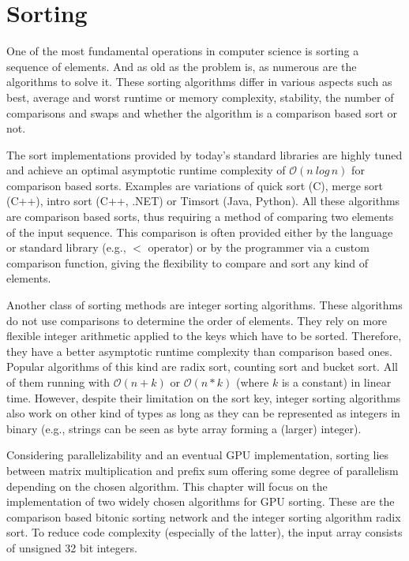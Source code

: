 \chapter{Sorting}
\label{sec:sorting}

One of the most fundamental operations in computer science is sorting a sequence of elements. And as old as the problem is, as numerous are the algorithms to solve it. These sorting algorithms differ in various aspects such as best, average and worst runtime or memory complexity, stability, the number of comparisons and swaps and whether the algorithm is a comparison based sort or not.

The sort implementations provided by today's standard libraries are highly tuned and achieve an optimal asymptotic runtime complexity of $\mathcal{O}(n\:log\,n)$ for comparison based sorts. Examples are variations of quick sort (C), merge sort (C++), intro sort (C++, .NET) or Timsort (Java, Python). All these algorithms are comparison based sorts, thus requiring a method of comparing two elements of the input sequence. This comparison is often provided either by the language or standard library (e.g., $<$ operator) or by the programmer via a custom comparison function, giving the flexibility to compare and sort any kind of elements.

Another class of sorting methods are integer sorting algorithms. These algorithms do not use comparisons to determine the order of elements. They rely on more flexible integer arithmetic applied to the keys which have to be sorted. Therefore, they have a better asymptotic runtime complexity than comparison based ones. Popular algorithms of this kind are radix sort, counting sort and bucket sort. All of them running with $\mathcal{O}(n + k)$ or $\mathcal{O}(n * k)$ (where $k$ is a constant) in linear time.
However, despite their limitation on the sort key, integer sorting algorithms also work on other kind of types as long as they can be represented as integers in binary (e.g., strings can be seen as byte array forming a (larger) integer).

Considering parallelizability and an eventual GPU implementation, sorting lies between matrix multiplication and prefix sum offering some degree of parallelism depending on the chosen algorithm. This chapter will focus on the implementation of two widely chosen algorithms for GPU sorting. These are the comparison based bitonic sorting network and the integer sorting algorithm radix sort. To reduce code complexity (especially of the latter), the input array consists of unsigned 32 bit integers.


